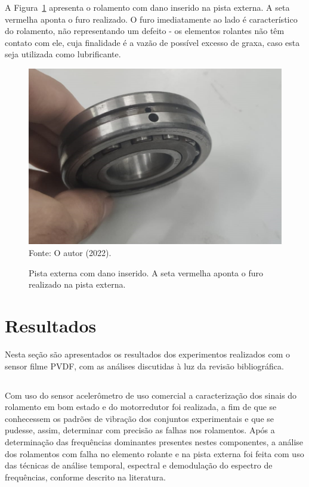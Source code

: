 \documentclass[
	12pt,				
	oneside,			
	a4paper,			
	english,			
	brazil,			
	]{abntex2ppgsi}
\begin{document}
A Figura~\ref{dano_pista_externa} apresenta o rolamento com dano inserido na pista externa. A seta vermelha aponta o furo realizado. O furo imediatamente ao lado é característico do rolamento, não representando um defeito - os elementos rolantes não têm contato com ele, cuja finalidade é a vazão de possível excesso de graxa, caso esta seja utilizada como lubrificante.

\begin{figure}[H]
\centering
\caption {Pista externa com dano inserido. A seta vermelha aponta o furo realizado na pista externa.}
\includegraphics[width=\textwidth,keepaspectratio]{dano_pista_externa_certo} \\
Fonte: O autor (2022).
\label{dano_pista_externa}
\end{figure}

\chapter{Resultados}

Nesta seção são apresentados os resultados dos experimentos realizados com o sensor filme PVDF, com as análises discutidas à luz da revisão bibliográfica. 

\section{}

Com uso do sensor acelerômetro de uso comercial a caracterização dos sinais do rolamento em bom estado e do motorredutor foi realizada, a fim de que se conhecessem os padrões de vibração dos conjuntos experimentais e que se pudesse, assim, determinar com precisão as falhas nos rolamentos. Após a determinação das frequências dominantes presentes nestes componentes, a análise dos rolamentos com falha no elemento rolante e na pista externa foi feita com uso das técnicas de análise temporal, espectral e demodulação do espectro de frequências, conforme descrito na literatura.
\end{document}
